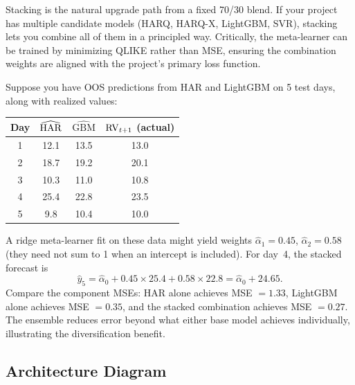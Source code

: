 \begin{enumerate}
        \begin{projectconnection}
        Stacking is the natural upgrade path from a fixed 70/30 blend.
        If your project has multiple candidate models (HARQ, HARQ-X,
        LightGBM, SVR), stacking lets you combine all of them in a
        principled way.  Critically, the meta-learner can be trained by
        minimizing QLIKE rather than MSE, ensuring the combination
        weights are aligned with the project's primary loss function.
        \end{projectconnection}
\end{enumerate}

\begin{workedexample}

Suppose you have OOS predictions from HAR and LightGBM on 5 test days,
along with realized values:

\medskip
\begin{center}
\begin{tabular}{cccc}
\toprule
Day & $\widehat{\operatorname{HAR}}$ & $\widehat{\text{GBM}}$ & $\operatorname{RV}_{t+1}$ (actual) \\
\midrule
1 & 12.1 & 13.5 & 13.0 \\
2 & 18.7 & 19.2 & 20.1 \\
3 & 10.3 & 11.0 & 10.8 \\
4 & 25.4 & 22.8 & 23.5 \\
5 &  9.8 & 10.4 & 10.0 \\
\bottomrule
\end{tabular}
\end{center}
\medskip

A ridge meta-learner fit on these data might yield weights
$\hat{\alpha}_1 = 0.45$, $\hat{\alpha}_2 = 0.58$ (they need not sum
to 1 when an intercept is included).  For day~4, the stacked forecast is
\[
  \hat{y}_5 = \hat{\alpha}_0 + 0.45 \times 25.4 + 0.58 \times 22.8
  = \hat{\alpha}_0 + 24.65.
\]
Compare the component MSEs: HAR alone achieves MSE $= 1.33$, LightGBM
alone achieves MSE $= 0.35$, and the stacked combination achieves
MSE $= 0.27$.  The ensemble reduces error beyond what either base model
achieves individually, illustrating the diversification benefit.

\end{workedexample}

\subsection{Architecture Diagram}

